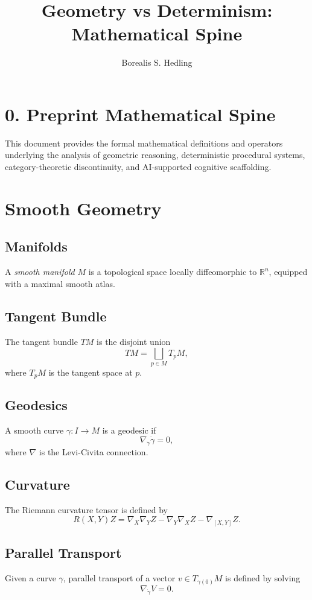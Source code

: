 \documentclass[12pt]{article}
\title{Geometry vs Determinism: Mathematical Spine}
\author{Borealis S. Hedling}
\date{}
\begin{document}
\maketitle

\section*{0. Preprint Mathematical Spine}
This document provides the formal mathematical definitions and operators
underlying the analysis of geometric reasoning, deterministic procedural
systems, category-theoretic discontinuity, and AI-supported cognitive
scaffolding.


\section{Smooth Geometry}

\subsection{Manifolds}
A \emph{smooth manifold} $M$ is a topological space locally diffeomorphic to
$\mathbb{R}^n$, equipped with a maximal smooth atlas.

\subsection{Tangent Bundle}
The tangent bundle $TM$ is the disjoint union
\[
TM = \bigsqcup_{p \in M} T_p M,
\]
where $T_p M$ is the tangent space at $p$.

\subsection{Geodesics}
A smooth curve $\gamma : I \to M$ is a geodesic if
\[
\nabla_{\dot{\gamma}} \dot{\gamma} = 0,
\]
where $\nabla$ is the Levi-Civita connection.

\subsection{Curvature}
The Riemann curvature tensor is defined by
\[
R(X,Y)Z = \nabla_X \nabla_Y Z - \nabla_Y \nabla_X Z - \nabla_{[X,Y]} Z.
\]

\subsection{Parallel Transport}
Given a curve $\gamma$, parallel transport of a vector $v \in T_{\gamma(0)}M$
is defined by solving
\[
\nabla_{\dot{\gamma}} V = 0.
\]
\end{document}
